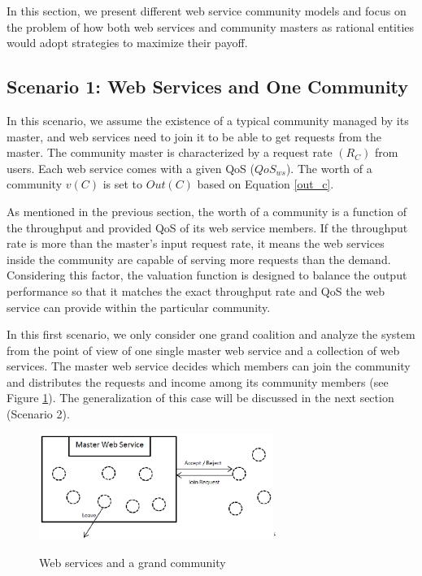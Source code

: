 \documentclass[10pt,journal,cspaper,compsoc]{IEEEtran}
\begin{document}
In this section, we present different web service community models
and focus on the problem of how both web services and community
masters as rational entities would adopt strategies to maximize
their payoff.

\subsection {Scenario 1: Web Services and One Community}

In this scenario, we assume the existence of a typical community
managed by its master, and web services need to join it to be able
to get requests from the master. The community master is
characterized by a request rate $(R_{C})$ from users. Each web
service comes with a given QoS ($QoS_{ws}$). The worth of a
community $v(C)$ is set to $Out(C)$ based on Equation \ref{out_c}.

As mentioned in the previous section, the worth of a community is
a function of the throughput and provided QoS of its web service
members. If the throughput rate is more than the master's input
request rate, it means the web services inside the community are
capable of serving more requests than the demand. Considering this
factor, the valuation function is designed to balance the output
performance so that it matches the exact throughput rate and QoS
the web service can provide within the particular community.

In this first scenario, we only consider one grand coalition and
analyze the system from the point of view of one single master web
service and a collection of web services. The master web service
decides which members can join
the community and distributes the requests and income among its
community members (see Figure \ref{fig_sim1}). The generalization
of this case will be discussed in the next section (Scenario 2).

\begin{figure}[!t]
\centering
\includegraphics[width=3in]{s1.eps}`
\caption{Web services and a grand community} \label{fig_sim1}
\end{figure}
\end{document}
